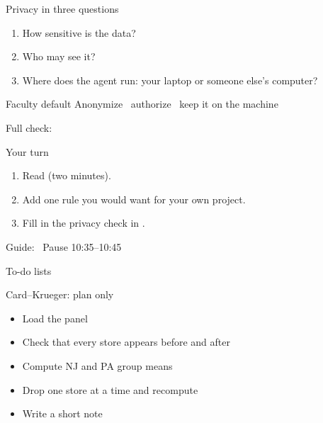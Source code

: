 \begin{frame}{Privacy in three questions}
  \begin{enumerate}
    \item How sensitive is the data?
    \item Who may see it?
    \item Where does the agent run: your laptop or someone else's computer?
  \end{enumerate}
  \vspace{0.5em}
  \begin{block}{Faculty default}
    \centering\large Anonymize \textperiodcentered\ authorize \textperiodcentered\ keep it on the machine
  \end{block}
  \vspace{0.3em}
  {\small Full check: }
\end{frame}

\begin{frame}{Your turn}
  \vspace{0.3em}
  \begin{enumerate}
    \item Read  (two minutes).
    \item Add one rule you would want for your own project.
    \item Fill in the privacy check in .
  \end{enumerate}
  \vspace{0.5em}
  {\small Guide:  \textperiodcentered\ Pause 10:35--10:45}
\end{frame}

\begin{frame}{To-do lists}
\end{frame}

\begin{frame}{Card--Krueger: plan only}
  \vspace{0.6em}
  \begin{itemize}
    \item[$\square$] Load the panel
    \item[$\square$] Check that every store appears before and after
    \item[$\square$] Compute NJ and PA group means
    \item[$\square$] Drop one store at a time and recompute
    \item[$\square$] Write a short note
  \end{itemize}
\end{frame}

